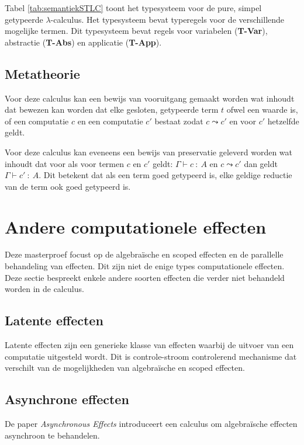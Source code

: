 Tabel \ref{tab:semantiekSTLC} toont het typesysteem voor de pure, simpel getypeerde $\lambda$-calculus. Het typesysteem bevat typeregels voor de verschillende mogelijke termen. Dit typesysteem bevat regels voor variabelen (\textbf{T-Var}), abstractie (\textbf{T-Abs}) en applicatie (\textbf{T-App}).

\subsection{Metatheorie}
Voor deze calculus kan een bewijs van vooruitgang gemaakt worden wat inhoudt dat bewezen kan worden dat elke gesloten, getypeerde term $t$ ofwel een waarde is, of een computatie $c$ en een computatie $c'$ bestaat zodat $c \leadsto c'$ en voor $c'$ hetzelfde geldt. \newline

Voor deze calculus kan eveneens een bewijs van preservatie geleverd worden wat inhoudt dat voor als voor termen $c$ en $c'$ geldt: $\Gamma \vdash c\::\:A$ en $c \leadsto c'$ dan geldt $\Gamma \vdash c' \::\:A$. Dit betekent dat als een term goed getypeerd is, elke geldige reductie van de term ook goed getypeerd is.

\section{Andere computationele effecten}
Deze masterproef focust op de algebraïsche en scoped effecten en de parallelle behandeling van effecten. Dit zijn niet de enige types computationele effecten. Deze sectie bespreekt enkele andere soorten effecten die verder niet behandeld worden in de calculus. 

\subsection{Latente effecten}
Latente effecten \cite{vandenBerg2021} zijn een generieke klasse van effecten waarbij de uitvoer van een computatie uitgesteld wordt. Dit is controle-stroom controlerend mechanisme dat verschilt van de mogelijkheden van algebraïsche en scoped effecten.

\subsection{Asynchrone effecten}
De paper \emph{Asynchronous Effects} \cite{Ahman2020} introduceert een calculus om algebraïsche effecten asynchroon te behandelen. %

